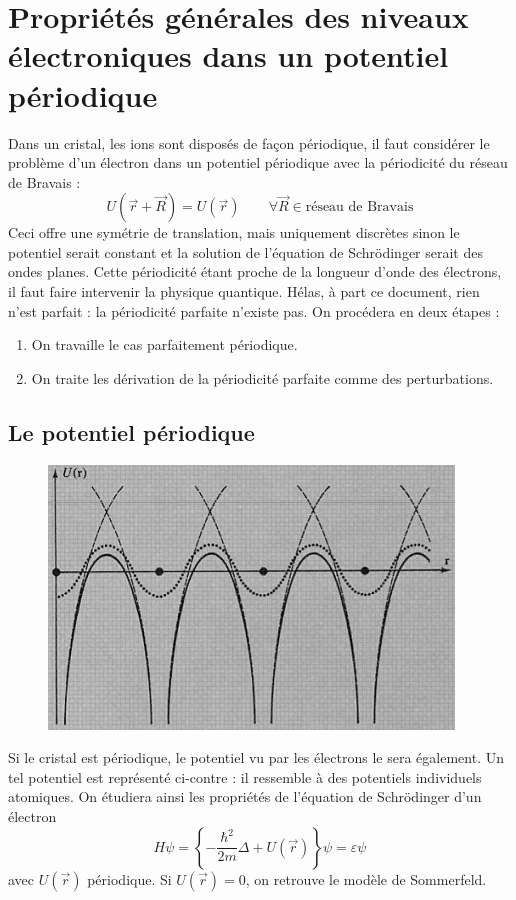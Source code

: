 \setcounter{chapter}{3}
\chapter{Propriétés générales des niveaux électroniques dans un 
potentiel périodique}
Dans un cristal, les ions sont disposés de façon périodique, il faut 
considérer le problème d'un électron dans un potentiel périodique 
avec la périodicité du réseau de Bravais :
\begin{equation}
U(\vec{r}+\vec{R}) = U(\vec{r})\qquad\forall\vec{R} \in \text{réseau 
de Bravais}
\end{equation}
Ceci offre une symétrie de translation, mais uniquement discrètes 
sinon le potentiel serait constant et la solution de l'équation 
de Schrödinger serait des ondes planes. Cette périodicité étant proche de 
la longueur d'onde des électrons, il faut faire intervenir la physique 
quantique. Hélas, à part ce document, rien n'est parfait : la 
périodicité parfaite n'existe pas. On procédera en deux étapes :
\begin{enumerate}
\item On travaille le cas parfaitement périodique.
\item On traite les dérivation de la périodicité parfaite comme des 
perturbations.
\end{enumerate}

	\section{Le potentiel périodique}
	\begin{figure}
	\vspace{-0.5cm}
	\includegraphics[scale=0.5]{ch4/image1.png}
	\end{figure}
	Si le cristal est périodique, le potentiel vu par les électrons 
	le sera également. Un tel potentiel est représenté ci-contre : 
	il ressemble à des potentiels individuels atomiques. On étudiera 
	ainsi les propriétés de l'équation de Schrödinger d'un électron 
	\begin{equation}
	H\psi = \left\{-\frac{\hbar^2}{2m}\Delta + U(\vec{r})\right\}\psi 
	= \varepsilon\psi
	\label{eq:Schod}
	\end{equation}
	avec $U(\vec{r})$ périodique. Si $U(\vec{r})=0$, on retrouve le 
	modèle de Sommerfeld.
	
